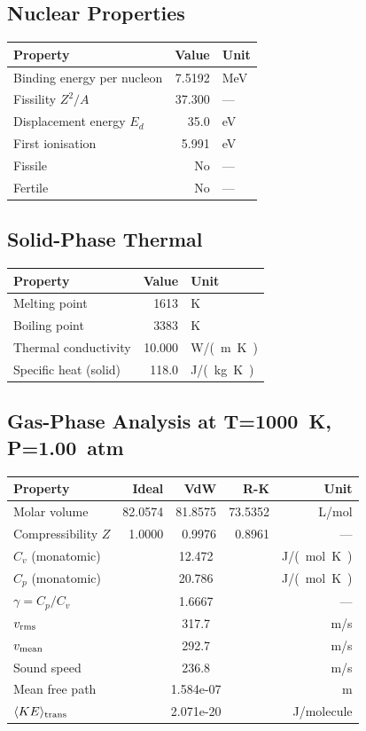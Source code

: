 \documentclass[11pt,a4paper]{article}
\begin{document}
\subsection{Nuclear Properties}
\begin{tabular}{lrl}
  \toprule
  Property & Value & Unit \\
  \midrule
  Binding energy per nucleon & 7.5192 & \si{MeV} \\
  Fissility $Z^2/A$ & 37.300 & --- \\
  Displacement energy $E_d$ & 35.0 & \si{eV} \\
  First ionisation & 5.991 & \si{eV} \\
  Fissile & No & --- \\
  Fertile & No & --- \\
  \bottomrule
\end{tabular}

\subsection{Solid-Phase Thermal}
\begin{tabular}{lrl}
  \toprule
  Property & Value & Unit \\
  \midrule
  Melting point & 1613 & \si{K} \\
  Boiling point & 3383 & \si{K} \\
  Thermal conductivity & 10.000 & \si{W/(m.K)} \\
  Specific heat (solid) & 118.0 & \si{J/(kg.K)} \\
  \bottomrule
\end{tabular}

\subsection{Gas-Phase Analysis at T=\SI{1000}{K}, P=\SI{1.00}{atm}}
\begin{tabular}{lrrrr}
  \toprule
  Property & Ideal & VdW & R-K & Unit \\
  \midrule
  Molar volume & 82.0574 & 81.8575 & 73.5352 & \si{L/mol} \\
  Compressibility $Z$ & 1.0000 & 0.9976 & 0.8961 & --- \\
  \midrule
  $C_v$ (monatomic) & \multicolumn{3}{c}{12.472} & \si{J/(mol.K)} \\
  $C_p$ (monatomic) & \multicolumn{3}{c}{20.786} & \si{J/(mol.K)} \\
  $\gamma = C_p/C_v$ & \multicolumn{3}{c}{1.6667} & --- \\
  $v_{\rm rms}$ & \multicolumn{3}{c}{317.7} & \si{m/s} \\
  $v_{\rm mean}$ & \multicolumn{3}{c}{292.7} & \si{m/s} \\
  Sound speed & \multicolumn{3}{c}{236.8} & \si{m/s} \\
  Mean free path & \multicolumn{3}{c}{1.584e-07} & \si{m} \\
  $\langle KE \rangle_{\rm trans}$ & \multicolumn{3}{c}{2.071e-20} & \si{J/molecule} \\
  \bottomrule
\end{tabular}
\end{document}
